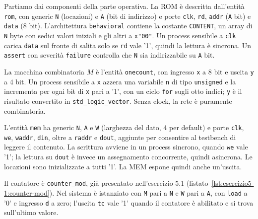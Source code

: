 \implementazione

Partiamo dai componenti della parte operativa. La ROM è descritta dall'entità \texttt{rom}, con generic \texttt{N} (locazioni) e \texttt{A} (bit di indirizzo) e porte \texttt{clk}, \texttt{rd}, \texttt{addr} (\texttt{A} bit) e \texttt{data} (8 bit). L'architettura \texttt{behavioral} contiene la costante \texttt{CONTENT}, un array di \texttt{N} byte con sedici valori iniziali e gli altri a \texttt{x"00"}. Un process sensibile a \texttt{clk} carica \texttt{data} sul fronte di salita solo se \texttt{rd} vale '1', quindi la lettura è sincrona. Un \texttt{assert} con severità \texttt{failure} controlla che \texttt{N} sia indirizzabile su \texttt{A} bit. 


La macchina combinatoria $M$ è l'entità \texttt{onecount}, con ingresso \texttt{x} a 8 bit e uscita \texttt{y} a 4 bit. Un process sensibile a \texttt{x} azzera una variabile \texttt{n} di tipo \texttt{unsigned} e la incrementa per ogni bit di \texttt{x} pari a '1', con un ciclo \texttt{for} sugli otto indici; \texttt{y} è il risultato convertito in \texttt{std\_logic\_vector}. Senza clock, la rete è puramente combinatoria.


L'entità \texttt{mem} ha generic \texttt{N}, \texttt{A} e \texttt{W} (larghezza del dato, 4 per default) e porte \texttt{clk}, \texttt{we}, \texttt{waddr}, \texttt{din}, oltre a \texttt{raddr} e \texttt{dout}, aggiunte per consentire al testbench di leggere il contenuto. La scrittura avviene in un process sincrono, quando \texttt{we} vale '1'; la lettura su \texttt{dout} è invece un assegnamento concorrente, quindi asincrona. Le locazioni sono inizializzate a tutti '1'. La MEM espone quindi anche un'uscita.


Il contatore è \texttt{counter\_mod}, già presentato nell'esercizio 5.1 (listato~\ref{lst:esercizio5-1:counter-mod}). Nel sistema è istanziato con \texttt{M} pari a \texttt{N} e \texttt{W} pari a \texttt{A}, con \texttt{load} a '0' e ingresso \texttt{d} a zero; l'uscita \texttt{tc} vale '1' quando il contatore è abilitato e si trova sull'ultimo valore.

